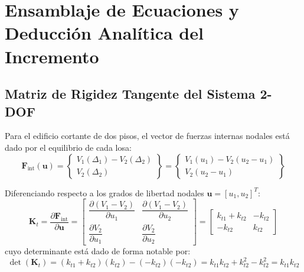 \documentclass[11pt,letterpaper]{article}
\begin{document}
\section{Ensamblaje de Ecuaciones y Deducción Analítica del Incremento}

\subsection{Matriz de Rigidez Tangente del Sistema 2-DOF}

Para el edificio cortante de dos pisos, el vector de fuerzas internas nodales está dado por el equilibrio de cada losa:
\begin{equation}
    \mathbf{F}_{\text{int}}(\mathbf{u}) = \begin{Bmatrix} V_1(\Delta_1) - V_2(\Delta_2) \\ V_2(\Delta_2) \end{Bmatrix} = \begin{Bmatrix} V_1(u_1) - V_2(u_2 - u_1) \\ V_2(u_2 - u_1) \end{Bmatrix}
\end{equation}

Diferenciando respecto a los grados de libertad nodales $\mathbf{u} = [u_1, u_2]^T$:
\begin{equation}
    \mathbf{K}_t = \frac{\partial \mathbf{F}_{\text{int}}}{\partial \mathbf{u}} = 
    \begin{bmatrix}
        \dfrac{\partial (V_1 - V_2)}{\partial u_1} & \dfrac{\partial (V_1 - V_2)}{\partial u_2} \\[0.25cm]
        \dfrac{\partial V_2}{\partial u_1} & \dfrac{\partial V_2}{\partial u_2}
    \end{bmatrix}
    =
    \begin{bmatrix}
        k_{t1} + k_{t2} & -k_{t2} \\
        -k_{t2} & k_{t2}
    \end{bmatrix}
\end{equation}
cuyo determinante está dado de forma notable por:
\begin{equation}
    \det(\mathbf{K}_t) = (k_{t1} + k_{t2})(k_{t2}) - (-k_{t2})(-k_{t2}) = k_{t1} k_{t2} + k_{t2}^2 - k_{t2}^2 = k_{t1} k_{t2}
\end{equation}
\end{document}
